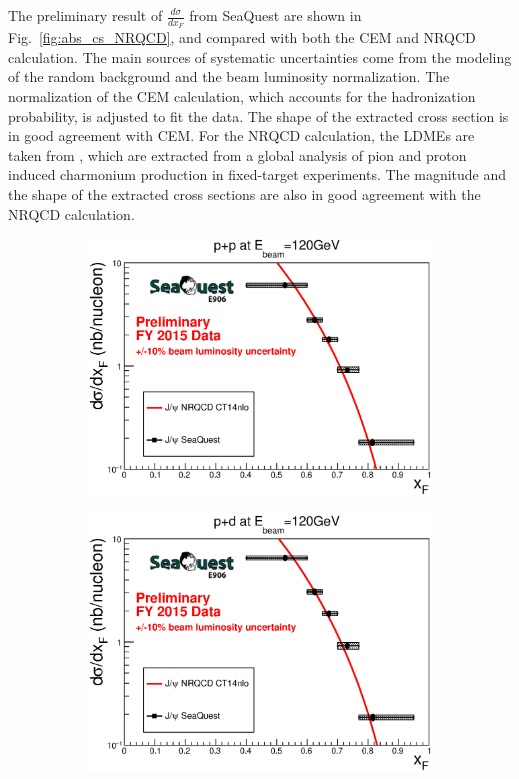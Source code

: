 \documentclass[10pt,a4paper,final]{article}
\begin{document}
The preliminary result of $\frac{d\sigma}{dx_F}$ from SeaQuest are shown in
Fig.~\ref{fig:abs_cs_NRQCD}, and compared with both the CEM and NRQCD calculation.
The main sources of systematic uncertainties come from the modeling of the random background
and the beam luminosity normalization. The normalization of the CEM calculation,
which accounts for the hadronization probability, is adjusted to fit the data. The
shape of the extracted cross section is in good agreement with CEM. For the NRQCD
calculation, the LDMEs are taken from \cite{hsieh2021}, which are extracted from
a global analysis of pion and proton induced charmonium production in fixed-target
experiments. The magnitude and the shape of the extracted cross
sections are also in good agreement with the NRQCD calculation.
\begin{figure}[h!]
	\centering
	\begin{subfigure}{0.45\linewidth}
		\includegraphics[width=0.9\linewidth]{jpsi_xF_LH2}
	\end{subfigure}
	\begin{subfigure}{0.45\linewidth}
		\includegraphics[width=0.9\linewidth]{jpsi_xF_LD2}

\end{subfigure}
\end{figure}
\end{document}
